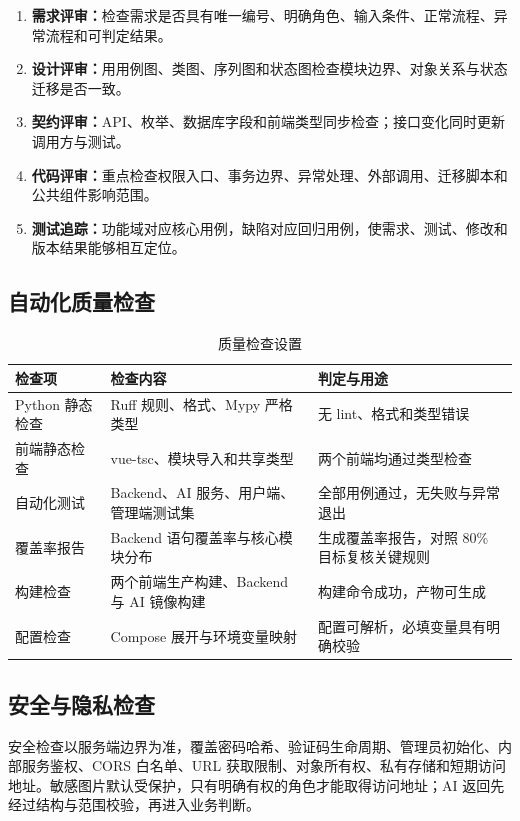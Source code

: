 \begin{enumerate}
  \item \textbf{需求评审：}检查需求是否具有唯一编号、明确角色、输入条件、正常流程、异常流程和可判定结果。
  \item \textbf{设计评审：}用用例图、类图、序列图和状态图检查模块边界、对象关系与状态迁移是否一致。
  \item \textbf{契约评审：}API、枚举、数据库字段和前端类型同步检查；接口变化同时更新调用方与测试。
  \item \textbf{代码评审：}重点检查权限入口、事务边界、异常处理、外部调用、迁移脚本和公共组件影响范围。
  \item \textbf{测试追踪：}功能域对应核心用例，缺陷对应回归用例，使需求、测试、修改和版本结果能够相互定位。
\end{enumerate}

\subsection{自动化质量检查}

\begin{table}[H]
  \centering
  \caption{质量检查设置}
  \begin{tabularx}{\textwidth}{L{2.7cm}L{4.3cm}Y}
    \toprule
    检查项 & 检查内容 & 判定与用途 \\
    \midrule
    Python 静态检查 & Ruff 规则、格式、Mypy 严格类型 & 无 lint、格式和类型错误 \\
    前端静态检查 & vue-tsc、模块导入和共享类型 & 两个前端均通过类型检查 \\
    自动化测试 & Backend、AI 服务、用户端、管理端测试集 & 全部用例通过，无失败与异常退出 \\
    覆盖率报告 & Backend 语句覆盖率与核心模块分布 & 生成覆盖率报告，对照 80\% 目标复核关键规则 \\
    构建检查 & 两个前端生产构建、Backend 与 AI 镜像构建 & 构建命令成功，产物可生成 \\
    配置检查 & Compose 展开与环境变量映射 & 配置可解析，必填变量具有明确校验 \\
    \bottomrule
  \end{tabularx}
\end{table}

\subsection{安全与隐私检查}

安全检查以服务端边界为准，覆盖密码哈希、验证码生命周期、管理员初始化、内部服务鉴权、CORS 白名单、URL 获取限制、对象所有权、私有存储和短期访问地址。敏感图片默认受保护，只有明确有权的角色才能取得访问地址；AI 返回先经过结构与范围校验，再进入业务判断。

